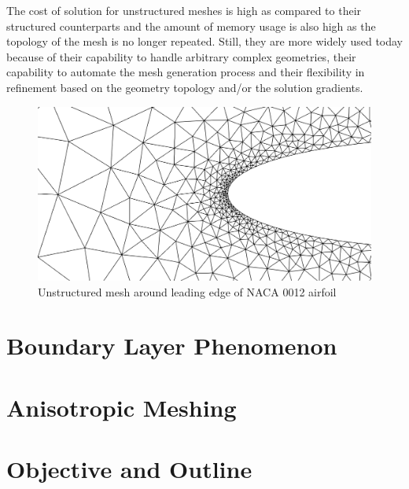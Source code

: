 The cost of solution for unstructured meshes is high as compared to their structured counterparts and the amount of memory usage is also high as the topology of the mesh is no longer repeated. Still, they are more widely used today because of their capability to handle arbitrary complex geometries, their capability to automate the mesh generation process and their flexibility in refinement based on the geometry topology and/or the solution gradients.

\begin{figure}
  \centering
  \includegraphics[width=0.6\linewidth]{img/intro/unstructuredNaca0012.png}
  \caption{Unstructured mesh around leading edge of NACA 0012 airfoil}
  \label{fig-unstructuredNaca0012}
\end{figure}

\section{Boundary Layer Phenomenon}

\section{Anisotropic Meshing}

\section{Objective and Outline}
